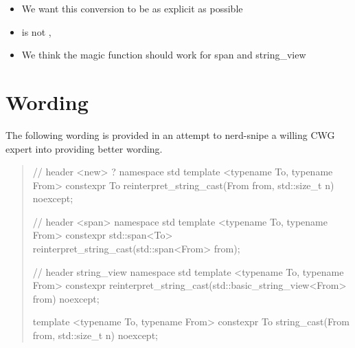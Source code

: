 \documentclass{wg21}
\begin{document}
\begin{itemize}
    \item We want this conversion to be as explicit as possible
    \item {} is not ,
    \item We think the magic function should work for span and string_view
\end{itemize}

\section{Wording}

The following wording is provided in an attempt to nerd-snipe a willing CWG expert into providing better wording.

\begin{quote}
\begin{addedblock}
\begin{codeblock}

// header <new> ?
namespace std {
    template <typename To, typename From>
    constexpr To reinterpret_string_cast(From from, std::size_t n) noexcept;
}

// header <span>
namespace std {
    template <typename To, typename From>
    constexpr std::span<To> reinterpret_string_cast(std::span<From> from);
}

// header string_view
namespace std {
    template <typename To, typename From>
    constexpr reinterpret_string_cast(std::basic_string_view<From> from) noexcept;
}

\end{codeblock}


\begin{itemdecl}
template <typename To, typename From>
constexpr To string_cast(From from, std::size_t n) noexcept;
\end{itemdecl}


\end{addedblock}
\end{quote}
\end{document}
